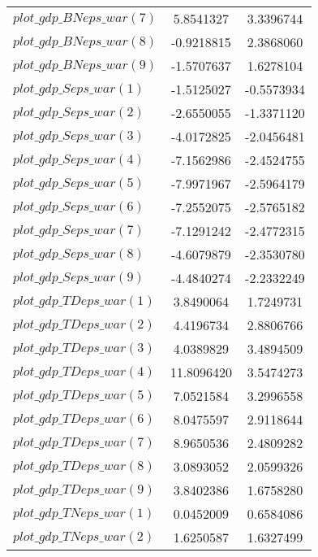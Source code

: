 \begin{center}
\begin{longtable}{lcc}
$plot\_gdp\_BN eps\_war (7)  $	 & 	      5.8541327	 & 	      3.3396744 \\ 
$plot\_gdp\_BN eps\_war (8)  $	 & 	     -0.9218815	 & 	      2.3868060 \\ 
$plot\_gdp\_BN eps\_war (9)  $	 & 	     -1.5707637	 & 	      1.6278104 \\ 
$plot\_gdp\_S eps\_war (1)   $	 & 	     -1.5125027	 & 	     -0.5573934 \\ 
$plot\_gdp\_S eps\_war (2)   $	 & 	     -2.6550055	 & 	     -1.3371120 \\ 
$plot\_gdp\_S eps\_war (3)   $	 & 	     -4.0172825	 & 	     -2.0456481 \\ 
$plot\_gdp\_S eps\_war (4)   $	 & 	     -7.1562986	 & 	     -2.4524755 \\ 
$plot\_gdp\_S eps\_war (5)   $	 & 	     -7.9971967	 & 	     -2.5964179 \\ 
$plot\_gdp\_S eps\_war (6)   $	 & 	     -7.2552075	 & 	     -2.5765182 \\ 
$plot\_gdp\_S eps\_war (7)   $	 & 	     -7.1291242	 & 	     -2.4772315 \\ 
$plot\_gdp\_S eps\_war (8)   $	 & 	     -4.6079879	 & 	     -2.3530780 \\ 
$plot\_gdp\_S eps\_war (9)   $	 & 	     -4.4840274	 & 	     -2.2332249 \\ 
$plot\_gdp\_TD eps\_war (1)  $	 & 	      3.8490064	 & 	      1.7249731 \\ 
$plot\_gdp\_TD eps\_war (2)  $	 & 	      4.4196734	 & 	      2.8806766 \\ 
$plot\_gdp\_TD eps\_war (3)  $	 & 	      4.0389829	 & 	      3.4894509 \\ 
$plot\_gdp\_TD eps\_war (4)  $	 & 	     11.8096420	 & 	      3.5474273 \\ 
$plot\_gdp\_TD eps\_war (5)  $	 & 	      7.0521584	 & 	      3.2996558 \\ 
$plot\_gdp\_TD eps\_war (6)  $	 & 	      8.0475597	 & 	      2.9118644 \\ 
$plot\_gdp\_TD eps\_war (7)  $	 & 	      8.9650536	 & 	      2.4809282 \\ 
$plot\_gdp\_TD eps\_war (8)  $	 & 	      3.0893052	 & 	      2.0599326 \\ 
$plot\_gdp\_TD eps\_war (9)  $	 & 	      3.8402386	 & 	      1.6758280 \\ 
$plot\_gdp\_TN eps\_war (1)  $	 & 	      0.0452009	 & 	      0.6584086 \\ 
$plot\_gdp\_TN eps\_war (2)  $	 & 	      1.6250587	 & 	      1.6327499 \\ 

\end{longtable}
\end{center}
